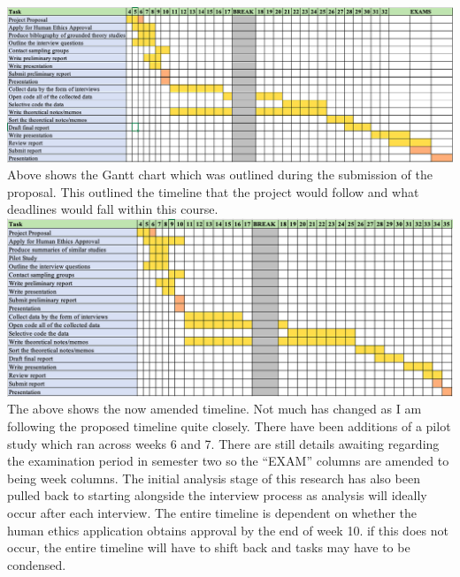 \includegraphics[width=\textwidth]{figures/fig1.png}
\newline
\newline
Above shows the Gantt chart which was outlined during the submission of the proposal. This outlined the timeline that the project would follow and what deadlines would fall within this course. 
\newline
\newline
\includegraphics[width=\textwidth]{figures/fig2.png}
\newline
\newline
The above shows the now amended timeline. Not much has changed as I am following the proposed timeline quite closely. There have been additions of a pilot study which ran across weeks 6 and 7. There are still details awaiting regarding the examination period in semester two so the “EXAM” columns are amended to being week columns. The initial analysis stage of this research has also been pulled back to starting alongside the interview process as analysis will ideally occur after each interview. The entire timeline is dependent on whether the human ethics application obtains approval by the end of week 10. if this does not occur, the entire timeline will have to shift back and tasks may have to be condensed.






